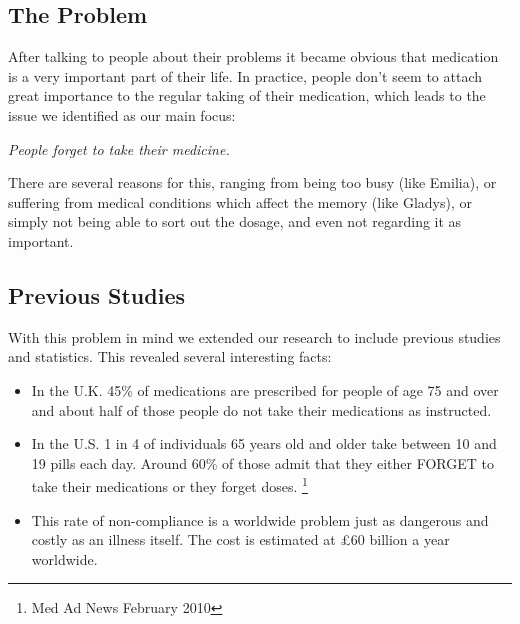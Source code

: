 \documentclass{article}
\begin{document}
	\subsection{The Problem}
	After talking to people about their problems it became obvious that medication is a very important part of their life. In practice, people don't seem to attach great importance to the regular taking of their medication, which leads to the issue we identified as our main focus:\medskip
	\begin{center}\emph{People forget to take their medicine.} \medskip
	\end{center}
	There are several reasons for this, ranging from being too busy (like Emilia), or suffering from medical conditions which affect the memory (like Gladys), or simply not being able to sort out the dosage, and even not regarding it as important.

	\subsection{Previous Studies}
	With this problem in mind we extended our research to include previous studies and statistics. This revealed several interesting facts:
	\begin{itemize}
	\item In the U.K. 45\% of medications are prescribed for people of age 75 and over and about half of those people do not take their medications as instructed. 
	\item In the U.S. 1 in 4 of individuals 65 years old and older take between 10 and 19 pills each day. Around 60\% of those admit that they either FORGET to take their medications or they forget doses. \footnote{Med Ad News February 2010}
	\item This rate of non-compliance is a worldwide problem just as dangerous and costly as an illness itself. The cost is estimated at \pounds60 billion a year worldwide.
	\end{itemize}
\end{document}
